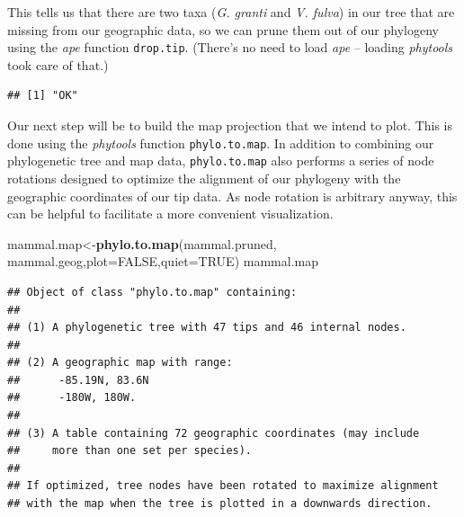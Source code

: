 \documentclass[fleqn,10pt,lineno]{wlpeerj} %
\newenvironment{Shaded}{\begin{snugshade}}{\end{snugshade}}
\newcommand{\AttributeTok}[1]{\textcolor[rgb]{0.13,0.29,0.53}{#1}}
\newcommand{\ConstantTok}[1]{\textcolor[rgb]{0.56,0.35,0.01}{#1}}
\newcommand{\FunctionTok}[1]{\textcolor[rgb]{0.13,0.29,0.53}{\textbf{#1}}}
\newcommand{\NormalTok}[1]{#1}
\newcommand{\OtherTok}[1]{\textcolor[rgb]{0.56,0.35,0.01}{#1}}
\newcommand{\SpecialCharTok}[1]{\textcolor[rgb]{0.81,0.36,0.00}{\textbf{#1}}}
\begin{document}
This tells us that there are two taxa (\emph{G. granti} and \emph{V. fulva}) in our tree that are missing from our geographic data, so we can prune them out of our phylogeny using the \emph{ape} function \texttt{drop.tip}. (There's no need to load \emph{ape} -- loading \emph{phytools} took care of that.)

\begin{Shaded}
\end{Shaded}

\begin{verbatim}
## [1] "OK"
\end{verbatim}

Our next step will be to build the map projection that we intend to plot. This is done using the \emph{phytools} function \texttt{phylo.to.map}. In addition to combining our phylogenetic tree and map data, \texttt{phylo.to.map} also performs a series of node rotations designed to optimize the alignment of our phylogeny with the geographic coordinates of our tip data. As node rotation is arbitrary anyway, this can be helpful to facilitate a more convenient visualization.

\begin{Shaded}
\begin{Highlighting}[]
\NormalTok{mammal.map}\OtherTok{\textless{}{-}}\FunctionTok{phylo.to.map}\NormalTok{(mammal.pruned,}
\NormalTok{  mammal.geog,}\AttributeTok{plot=}\ConstantTok{FALSE}\NormalTok{,}\AttributeTok{quiet=}\ConstantTok{TRUE}\NormalTok{)}
\NormalTok{mammal.map}
\end{Highlighting}
\end{Shaded}

\begin{verbatim}
## Object of class "phylo.to.map" containing:
## 
## (1) A phylogenetic tree with 47 tips and 46 internal nodes.
## 
## (2) A geographic map with range:
##      -85.19N, 83.6N
##      -180W, 180W.
## 
## (3) A table containing 72 geographic coordinates (may include
##     more than one set per species).
## 
## If optimized, tree nodes have been rotated to maximize alignment
## with the map when the tree is plotted in a downwards direction.
\end{verbatim}
\end{document}
